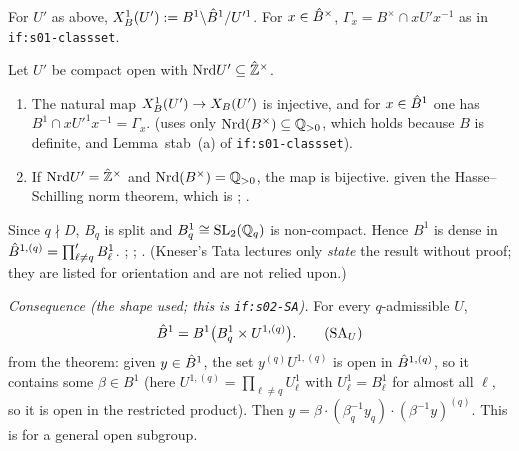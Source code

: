 \begin{definition}\label{def:s02-Xone}
For $U'$ as above, $X^1_B(U'):=B^1\backslash\hat{B}^1/U'^1$. For $x\in\hat{B}^\times$, $\Gamma_x=B^\times\cap xU'x^{-1}$
as in \texttt{if:s01-classset}.
\end{definition}

\begin{lemma}\label{lem:s02-normone}
Let $U'$ be compact open with $\mathrm{Nrd} U'\subseteq\hat{\mathbb{Z}}^\times$.
\begin{enumerate}[label=(\alph*)]
\item The natural map $X^1_B(U')\to X_B(U')$ is injective, and for $x\in\hat{B}^1$ one has
  $B^1\cap xU'^1x^{-1}=\Gamma_x$.\quad\stproved{} (uses only $\mathrm{Nrd}(B^\times)\subseteq\mathbb{Q}_{>0}$, which holds
  because $B$ is definite, and Lemma~stab~(a) of \texttt{if:s01-classset}).
\item If $\mathrm{Nrd} U'=\hat{\mathbb{Z}}^\times$ and $\mathrm{Nrd}(B^\times)=\mathbb{Q}_{>0}$, the map is bijective.\quad\stproved{} given
  the Hasse--Schilling norm theorem, which is \stcited{}
  ;
  .
\end{enumerate}
\end{lemma}

\begin{theorem}[strong approximation for $B^1$ at $S=\{\infty,q\}$]\label{thm:s02-SA}
Since $q\nmid D$, $B_q$ is split and $B^1_q\cong\mathrm{SL}_2(\mathbb{Q}_q)$ is non-compact. Hence $B^1$ is dense in
$\hat{B}^{1,(q)}=\prod'_{\ell\ne q}B^1_\ell$.
\stcited{} ;
;
.
(Kneser's Tata lectures  only \emph{state} the result without proof; they are listed for orientation and are not relied upon.)
\smallskip

\noindent\emph{Consequence (the shape used; this is \texttt{if:s02-SA}).} For every $q$-admissible $U$,
\[\hat{B}^1=B^1\big(B^1_q\times U^{1,(q)}\big).\tag{SA$_U$}\]
\stproved{} from the theorem: given $y\in\hat{B}^1$, the set $y^{(q)}U^{1,(q)}$ is open in $\hat{B}^{1,(q)}$, so it
contains some $\beta\in B^1$ (here $U^{1,(q)}=\prod_{\ell\ne q}U^1_\ell$ with $U^1_\ell=B^1_\ell$ for almost all $\ell$, so it is open in the restricted product). Then $y=\beta\cdot(\beta_q^{-1}y_q)\cdot(\beta^{-1}y)^{(q)}$. This is
 for a general open subgroup.
\end{theorem}

